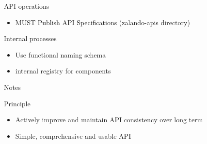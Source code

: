 \documentclass[10pt]{beamer}
\begin{document}
\begin{frame}{API operations}

\begin{itemize}
\tightlist
\item
  MUST Publish API Specifications (zalando-apis directory)
\end{itemize}

\end{frame}

\begin{frame}{Internal processes}

\begin{itemize}
\tightlist
\item
  Use functional naming schema
\item
  internal registry for components
\end{itemize}

\end{frame}

\begin{frame}{Notes}

\begin{block}{Principle}

\begin{itemize}
\tightlist
\item
  Actively improve and maintain API consistency over long term
\item
  Simple, comprehensive and usable API
\end{itemize}

\end{block}

\end{frame}
\end{document}
